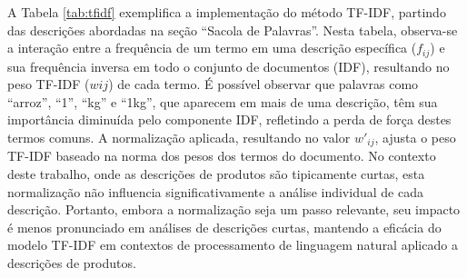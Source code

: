 A Tabela \ref{tab:tfidf} exemplifica a implementação do método TF-IDF, partindo das descrições abordadas na seção ``Sacola de Palavras''. Nesta tabela, observa-se a interação entre a frequência de um termo em uma descrição específica ($f_{ij}$) e sua frequência inversa em todo o conjunto de documentos (IDF), resultando no peso TF-IDF ($wij$) de cada termo. É possível observar que palavras como ``arroz'', ``1'', ``kg'' e ``1kg'', que aparecem em mais de uma descrição, têm sua importância diminuída pelo componente IDF, refletindo a perda de força destes termos comuns. A normalização aplicada, resultando no valor $w'_{ij}$, ajusta o peso TF-IDF baseado na norma dos pesos dos termos do documento. No contexto deste trabalho, onde as descrições de produtos são tipicamente curtas, esta normalização não influencia significativamente a análise individual de cada descrição. Portanto, embora a normalização seja um passo relevante, seu impacto é menos pronunciado em análises de descrições curtas, mantendo a eficácia do modelo TF-IDF em contextos de processamento de linguagem natural aplicado a descrições de produtos.

